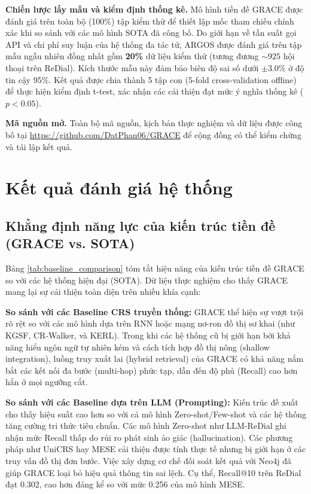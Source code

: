 \textbf{Chiến lược lấy mẫu và kiểm định thống kê.}
Mô hình tiền đề GRACE được đánh giá trên toàn bộ (100\%) tập kiểm thử để thiết lập mốc tham chiếu chính xác khi so sánh với các mô hình SOTA đã công bố. Do giới hạn về tần suất gọi API và chi phí suy luận của hệ thống đa tác tử, ARGOS được đánh giá trên tập mẫu ngẫu nhiên đồng nhất gồm \textbf{20\%} dữ liệu kiểm thử (tương đương $\sim 925$ hội thoại trên ReDial). Kích thước mẫu này đảm bảo biên độ sai số dưới $\pm 3.0\%$ ở độ tin cậy 95\%. Kết quả được chia thành 5 tập con (5-fold cross-validation offline) để thực hiện kiểm định t-test, xác nhận các cải thiện đạt mức ý nghĩa thống kê ($p < 0.05$).

\textbf{Mã nguồn mở.}
Toàn bộ mã nguồn, kịch bản thực nghiệm và dữ liệu được công bố tại \url{https://github.com/DatPhan06/GRACE} để cộng đồng có thể kiểm chứng và tái lập kết quả.

\section{Kết quả đánh giá hệ thống}

\subsection{Khẳng định năng lực của kiến trúc tiền đề (GRACE vs. SOTA)}

Bảng \ref{tab:baseline_comparison} tóm tắt hiệu năng của kiến trúc tiền đề GRACE so với các hệ thống hiện đại (SOTA). Dữ liệu thực nghiệm cho thấy GRACE mang lại sự cải thiện toàn diện trên nhiều khía cạnh:

\textbf{So sánh với các Baseline CRS truyền thống:}
GRACE thể hiện sự vượt trội rõ rệt so với các mô hình dựa trên RNN hoặc mạng nơ-ron đồ thị sơ khai (như KGSF, CR-Walker, và KERL). Trong khi các hệ thống cũ bị giới hạn bởi khả năng hiểu ngôn ngữ tự nhiên kém và cách tích hợp đồ thị nông (shallow integration), luồng truy xuất lai (hybrid retrieval) của GRACE có khả năng nắm bắt các kết nối đa bước (multi-hop) phức tạp, dẫn đến độ phủ (Recall) cao hơn hẳn ở mọi ngưỡng cắt.

\textbf{So sánh với các Baseline dựa trên LLM (Prompting):}
Kiến trúc đề xuất cho thấy hiệu suất cao hơn so với cả mô hình Zero-shot/Few-shot và các hệ thống tăng cường tri thức tiêu chuẩn. Các mô hình Zero-shot như LLM-ReDial ghi nhận mức Recall thấp do rủi ro phát sinh ảo giác (hallucination). Các phương pháp như UniCRS hay MESE cải thiện được tính thực tế nhưng bị giới hạn ở các truy vấn đồ thị đơn bước. Việc xây dựng cơ chế đối soát kết quả với Neo4j đã giúp GRACE loại bỏ hiệu quả thông tin sai lệch. Cụ thể, Recall@10 trên ReDial đạt 0.302, cao hơn đáng kể so với mức 0.256 của mô hình MESE.

